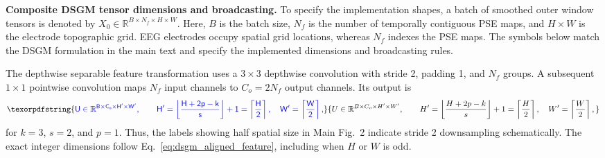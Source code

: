 \documentclass[12pt]{article}
\providecommand{\DIFaddtex}[1]{{\protect\color{blue}\sf #1}}
\providecommand{\DIFadd}[1]{\texorpdfstring{\DIFaddtex{#1}}{#1}}
\providecommand{\DIFaddbegin}{}
\providecommand{\DIFaddFL}[1]{\DIFadd{#1}}
\begin{document}
\DIFaddbegin \DIFadd{\textbf{Composite DSGM tensor dimensions and broadcasting.}
To specify the implementation shapes, a batch of smoothed outer window tensors is denoted by $X_0\in\mathbb{R}^{B\times N_f\times H\times W}$. Here, $B$ is the batch size, $N_f$ is the number of temporally contiguous PSE maps, and $H\times W$ is the electrode topographic grid. EEG electrodes occupy spatial grid locations, whereas $N_f$ indexes the PSE maps. The symbols below match the DSGM formulation in the main text and specify the implemented dimensions and broadcasting rules.
}

\DIFadd{The depthwise separable feature transformation uses a $3\times3$ depthwise convolution with stride 2, padding 1, and $N_f$ groups. A subsequent $1\times1$ pointwise convolution maps $N_f$ input channels to $C_o=2N_f$ output channels. Its output is
}\begin{equation}
\DIFadd{U\in\mathbb{R}^{B\times C_o\times H'\times W'},\qquad
H'=\left\lfloor\frac{H+2p-k}{s}\right\rfloor+1=\left\lceil\frac{H}{2}\right\rceil,\quad
W'=\left\lceil\frac{W}{2}\right\rceil,
\label{eq:dsgm_aligned_feature}
}\end{equation}
\DIFadd{for $k=3$, $s=2$, and $p=1$. Thus, the labels showing half spatial size in Main Fig.~2 indicate stride 2 downsampling schematically. The exact integer dimensions follow Eq.~\ref{eq:dsgm_aligned_feature}, including when $H$ or $W$ is odd.
}

\begin{table}[htbp]
\centering
\caption{\DIFaddFL{Dimensions and broadcasting by operation.}}
\label{tab:dsgm_operation_dimensions}
{\footnotesize
\setlength{\tabcolsep}{3pt}
\renewcommand{\arraystretch}{1.18}
}
\end{table}
\end{document}
